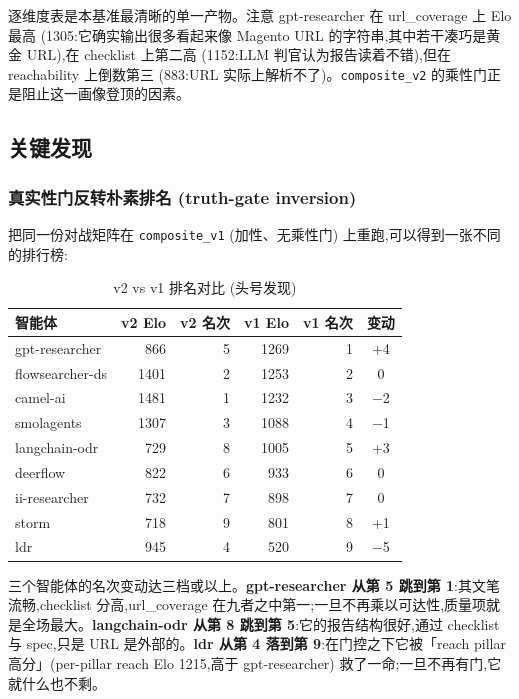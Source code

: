 \documentclass[UTF8,a4paper,12pt,oneside]{ctexart}
\begin{document}
逐维度表是本基准最清晰的单一产物。注意 gpt-researcher 在 url\_coverage 上 Elo 最高 (1305:它确实输出很多看起来像 Magento URL 的字符串,其中若干凑巧是黄金 URL),在 checklist 上第二高 (1152:LLM 判官认为报告读着不错),但在 reachability 上倒数第三 (883:URL 实际上解析不了)。\texttt{composite\_v2} 的乘性门正是阻止这一画像登顶的因素。

\subsection{关键发现}

\subsubsection{真实性门反转朴素排名 (truth-gate inversion)}

把同一份对战矩阵在 \texttt{composite\_v1} (加性、无乘性门) 上重跑,可以得到一张不同的排行榜:

\begin{table}[ht]
\centering
\small
\caption{v2 vs v1 排名对比 (头号发现)}
\label{tab:inversion}
\begin{tabular}{l r r r r c}
\toprule
智能体 & v2 Elo & v2 名次 & v1 Elo & v1 名次 & 变动 \\
\midrule
gpt-researcher & 866 & 5 & 1269 & 1 & +4 \\
flowsearcher-ds & 1401 & 2 & 1253 & 2 & 0 \\
camel-ai & 1481 & 1 & 1232 & 3 & $-$2 \\
smolagents & 1307 & 3 & 1088 & 4 & $-$1 \\
langchain-odr & 729 & 8 & 1005 & 5 & +3 \\
deerflow & 822 & 6 & 933 & 6 & 0 \\
ii-researcher & 732 & 7 & 898 & 7 & 0 \\
storm & 718 & 9 & 801 & 8 & +1 \\
ldr & 945 & 4 & 520 & 9 & $-$5 \\
\bottomrule
\end{tabular}
\end{table}

三个智能体的名次变动达三档或以上。\textbf{gpt-researcher 从第 5 跳到第 1}:其文笔流畅,checklist 分高,url\_coverage 在九者之中第一;一旦不再乘以可达性,质量项就是全场最大。\textbf{langchain-odr 从第 8 跳到第 5}:它的报告结构很好,通过 checklist 与 spec,只是 URL 是外部的。\textbf{ldr 从第 4 落到第 9}:在门控之下它被「reach pillar 高分」(per-pillar reach Elo 1215,高于 gpt-researcher) 救了一命;一旦不再有门,它就什么也不剩。
\end{document}
